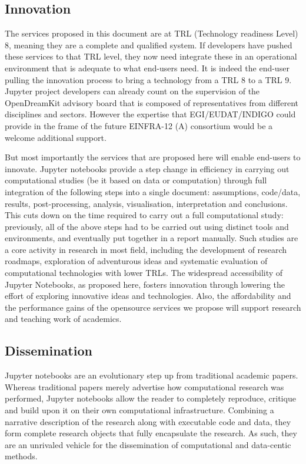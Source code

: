 \subsection{Innovation}

The services proposed in this document are at TRL (Technology readiness Level) 8,
meaning they are a complete and qualified system. If developers have pushed these
services to that TRL level, they now need integrate these in an operational
environment that is adequate to what end-users need. It is indeed the end-user
pulling the innovation process to bring a technology from a TRL 8 to a TRL 9.
Jupyter project developers can already count on the supervision of the OpenDreamKit
advisory board that is composed of representatives from different disciplines and
sectors. However the expertise that EGI/EUDAT/INDIGO could provide in the frame of
the future EINFRA-12 (A) consortium would be a welcome additional support.

But most importantly the services that are proposed here will enable
end-users to innovate. Jupyter notebooks provide a step change in efficiency in carrying out
computational studies (be it based on data or computation) through
full integration of the following steps into a single document:
assumptions, code/data, results, post-processing, analysis,
visualisation, interpretation and conclusions. This cuts down on the
time required to carry out a full computational study: previously, all
of the above steps had to be carried out using distinct tools and
environments, and eventually put together in a report manually. Such
studies are a core activity in research in most field, including the
development of research roadmaps, exploration of adventurous ideas and
systematic evaluation of computational technologies with lower
TRLs.
The widespread accessibility of Jupyter Notebooks, as proposed
here, fosters innovation through lowering the effort of exploring
innovative ideas and technologies. Also, the affordability and the performance gains
of the opensource services we propose will support research and teaching
work of academics.


\subsection{Dissemination}

Jupyter notebooks are an evolutionary step up from traditional
academic papers.  Whereas traditional papers merely advertise how
computational research was performed, Jupyter notebooks allow the
reader to completely reproduce, critique and build upon it on their
own computational infrastructure.  Combining a narrative description
of the research along with executable code and data, they form
complete research objects that fully encapsulate the research. As
such, they are an unrivaled vehicle for the dissemination of
computational and data-centic methods.

